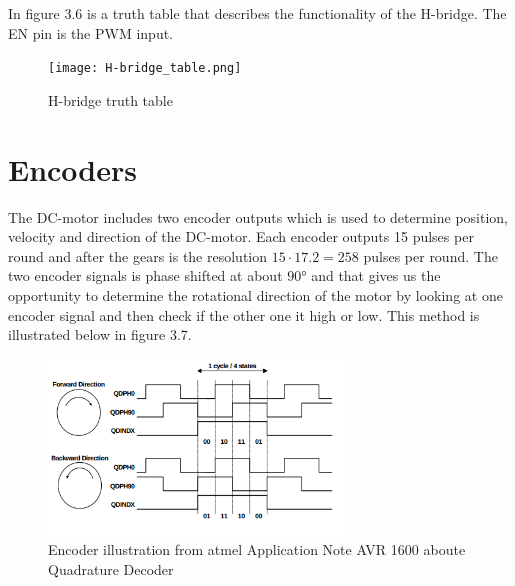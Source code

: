 In figure 3.6 is a truth table that describes the functionality of the H-bridge. The EN pin is the PWM input.  

  \begin{figure}[!h!]
	\centering
	\texttt{[image: H-bridge\_table.png]}
	\caption{H-bridge truth table}
	\label{fig:intro_4}
\end{figure}

\newpage
\section{Encoders}
  The DC-motor includes two encoder outputs which is used to determine position, velocity and direction of the DC-motor.
  Each encoder outputs 15 pulses per round and after the gears is the resolution $15 \cdot 17.2 = 258$ pulses per round.
  The two encoder signals is phase shifted at about $\ang{90}$ and that gives us the opportunity to determine the rotational direction of the motor by looking at one encoder signal and then check if the other one it high or low. This method is illustrated below in figure 3.7.
   
  \begin{figure}[!h!]
	\centering
	\includegraphics[width=0.7\textwidth]{resources/encoder_atmel.png}
	\caption{Encoder illustration from atmel Application Note AVR 1600 aboute Quadrature Decoder}
	\label{fig:5}
\end{figure}

